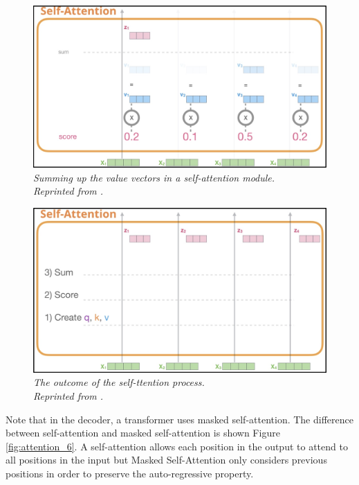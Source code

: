 \begin{figure}[H]
  \centering
  \caption[Summing up the value vectors in a self-attention module.]{\emph{Summing up the value vectors in a self-attention module. \\
      Reprinted from \citeauthor{alammar_2018} \citeyear{alammar_2018}.}}\label{fig:attention_4}
  \includegraphics[scale = 0.3]{figures/attention_4.jpg}
\end{figure}
\begin{figure}[H]
  \centering
  \caption[The outcome of the self-attention process.]{\emph{The outcome of the self-ttention process. \\Reprinted from \citeauthor{alammar_2018} \citeyear{alammar_2018}.}}\label{fig:attention_5}
  \includegraphics[scale = 0.3]{figures/attention_5.jpg}
\end{figure}


Note that in the decoder, a transformer uses masked self-attention. The difference between self-attention and masked self-attention is shown Figure \ref{fig:attention_6}. A self-attention allows each position in the output to attend to all positions in the input but Masked Self-Attention only considers previous positions in order to preserve the auto-regressive property.

